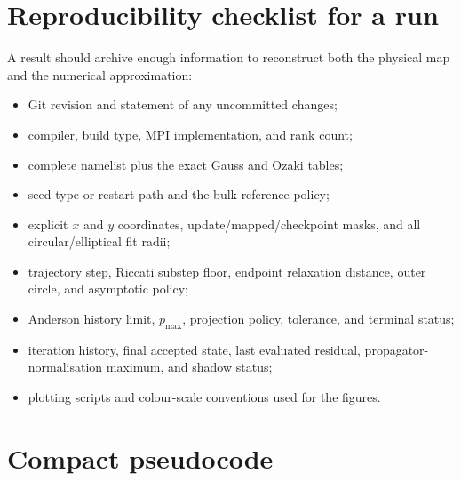 \documentclass[11pt,a4paper]{article}
\begin{document}


\section{Reproducibility checklist for a run}

A result should archive enough information to reconstruct both the physical
map and the numerical approximation:
\begin{itemize}
  \item Git revision and statement of any uncommitted changes;
  \item compiler, build type, MPI implementation, and rank count;
  \item complete namelist plus the exact Gauss and Ozaki tables;
  \item seed type or restart path and the bulk-reference policy;
  \item explicit $x$ and $y$ coordinates, update/mapped/checkpoint masks, and
  all circular/elliptical fit radii;
  \item trajectory step, Riccati substep floor, endpoint relaxation distance,
  outer circle, and asymptotic policy;
  \item Anderson history limit, $p_{\max}$, projection policy, tolerance, and
  terminal status;
  \item iteration history, final accepted state, last evaluated residual,
  propagator-normalisation maximum, and shadow status;
  \item plotting scripts and colour-scale conventions used for the figures.
\end{itemize}

\appendix
\section{Compact pseudocode}
\end{document}
